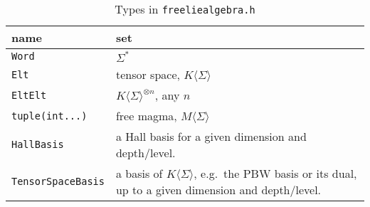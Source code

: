 \begin{table}
\begin{tabular}{lp{3.4in}}
name&set\\%
\hline
\verb|Word|&$\Sigma^*$\\
\verb|Elt|&tensor space, $K\langle \Sigma\rangle$\\
\verb|EltElt|&$K\langle \Sigma\rangle^{\otimes n}$, any $n$\\
\verb|tuple(int...)|&free magma, $M\langle \Sigma\rangle$\\
\verb|HallBasis|&a Hall basis for a given dimension and depth/level.\\
\verb|TensorSpaceBasis|&a basis of $K\langle \Sigma\rangle$, e.g.~the PBW basis or its dual, up to a given dimension and depth/level.
\end{tabular}
\caption{\label{tab:flaTypes}Types in \texttt{freeliealgebra.h}}
\end{table}
\iffalse

